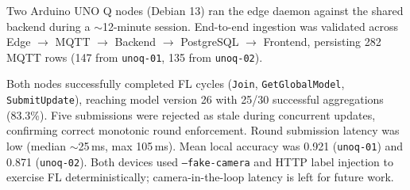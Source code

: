 Two Arduino UNO Q nodes (Debian 13) ran the edge daemon against the shared backend during a $\sim$12-minute session. End-to-end ingestion was validated across Edge $\rightarrow$ MQTT $\rightarrow$ Backend $\rightarrow$ PostgreSQL $\rightarrow$ Frontend, persisting 282 MQTT rows (147 from \texttt{unoq-01}, 135 from \texttt{unoq-02}).

Both nodes successfully completed FL cycles (\texttt{Join}, \texttt{GetGlobalModel}, \texttt{SubmitUpdate}), reaching model version 26 with 25/30 successful aggregations (83.3\%). Five submissions were rejected as stale during concurrent updates, confirming correct monotonic round enforcement. Round submission latency was low (median $\sim$25\,ms, max 105\,ms). Mean local accuracy was 0.921 (\texttt{unoq-01}) and 0.871 (\texttt{unoq-02}). Both devices used \texttt{--fake-camera} and HTTP label injection to exercise FL deterministically; camera-in-the-loop latency is left for future work.

